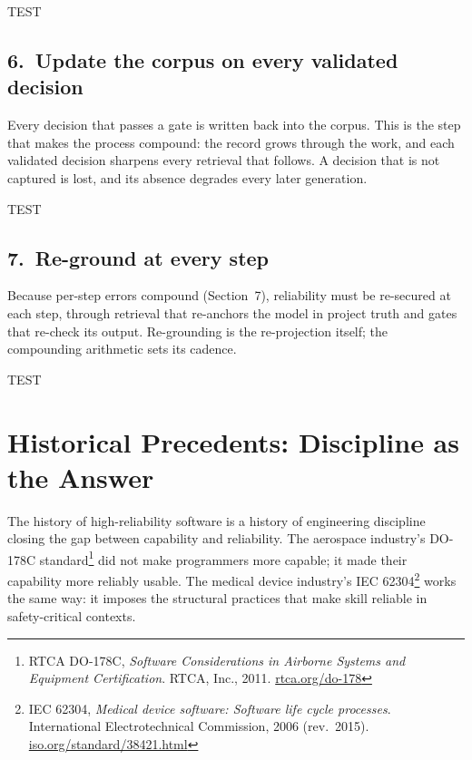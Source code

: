 \documentclass[11pt, a4paper]{article}
\newcommand{\principletest}[1]{%
  \par\vskip3pt\noindent
  {\labelfont\fontsize{8}{10}\selectfont\color{indigo}TEST}\hspace{7pt}{\itshape #1}\par}
\begin{document}
\principletest{If an agent that could read the gate's test harness could still pass without doing the work, it is a rubric, not a gate.}

\subsection*{6.~Update the corpus on every validated decision}

Every decision that passes a gate is written back into the corpus. This is the step that
makes the process compound: the record grows through the work, and each validated decision
sharpens every retrieval that follows. A decision that is not captured is lost, and its
absence degrades every later generation.

\principletest{Ask where last week's validated decision lives. If the only answer is ``the chat history,'' it is already lost to every future retrieval.}

\subsection*{7.~Re-ground at every step}

Because per-step errors compound (Section~7), reliability must be re-secured at each
step, through retrieval that re-anchors the model in project truth and gates that
re-check its output. Re-grounding is the re-projection itself; the compounding
arithmetic sets its cadence.

\principletest{Count the steps between two retrievals of project truth. Every step in that gap is one where the model trusts window residue and error compounds unchecked.}


\section{Historical Precedents: Discipline as the Answer}

The history of high-reliability software is a history of engineering discipline closing
the gap between capability and reliability. The aerospace industry's DO-178C
standard\footnote{RTCA DO-178C, \emph{Software Considerations in Airborne Systems and Equipment
Certification}. RTCA, Inc., 2011. \href{https://www.rtca.org/do-178/}{rtca.org/do-178}} did
not make programmers more capable; it made their capability more reliably usable. The
medical device industry's IEC
62304\footnote{IEC 62304, \emph{Medical device software: Software life cycle processes}.
International Electrotechnical Commission, 2006 (rev.\ 2015).
\href{https://www.iso.org/standard/38421.html}{iso.org/standard/38421.html}}
works the same way: it imposes the structural practices that make skill
reliable in safety-critical contexts.
\end{document}
